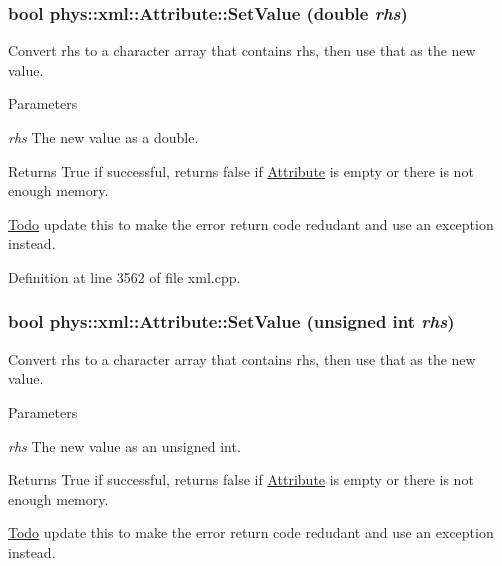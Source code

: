 \hypertarget{classphys_1_1xml_1_1Attribute_a919034671f61ee408d616409a49dafca}{
\subsubsection[{SetValue}]{\setlength{\rightskip}{0pt plus 5cm}bool phys::xml::Attribute::SetValue (double {\em rhs})}}
\label{da/ddf/classphys_1_1xml_1_1Attribute_a919034671f61ee408d616409a49dafca}


Convert rhs to a character array that contains rhs, then use that as the new value. 


\begin{DoxyParams}{Parameters}
\item[{\em rhs}]The new value as a double. \end{DoxyParams}
\begin{DoxyReturn}{Returns}
True if successful, returns false if \hyperlink{classphys_1_1xml_1_1Attribute}{Attribute} is empty or there is not enough memory. 
\end{DoxyReturn}
\begin{Desc}
\item[\hyperlink{todo__todo000040}{Todo}]update this to make the error return code redudant and use an exception instead. \end{Desc}


Definition at line 3562 of file xml.cpp.

\hypertarget{classphys_1_1xml_1_1Attribute_a289ac36b218f3912224fd904ccade1ed}{
\subsubsection[{SetValue}]{\setlength{\rightskip}{0pt plus 5cm}bool phys::xml::Attribute::SetValue (unsigned int {\em rhs})}}
\label{da/ddf/classphys_1_1xml_1_1Attribute_a289ac36b218f3912224fd904ccade1ed}


Convert rhs to a character array that contains rhs, then use that as the new value. 


\begin{DoxyParams}{Parameters}
\item[{\em rhs}]The new value as an unsigned int. \end{DoxyParams}
\begin{DoxyReturn}{Returns}
True if successful, returns false if \hyperlink{classphys_1_1xml_1_1Attribute}{Attribute} is empty or there is not enough memory. 
\end{DoxyReturn}
\begin{Desc}
\item[\hyperlink{todo__todo000039}{Todo}]update this to make the error return code redudant and use an exception instead. \end{Desc}


